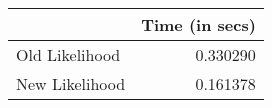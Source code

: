 \begin{tabular}{lr}
\toprule
{} &  Time (in secs) \\
\midrule
Old Likelihood &        0.330290 \\
New Likelihood &        0.161378 \\
\bottomrule
\end{tabular}
